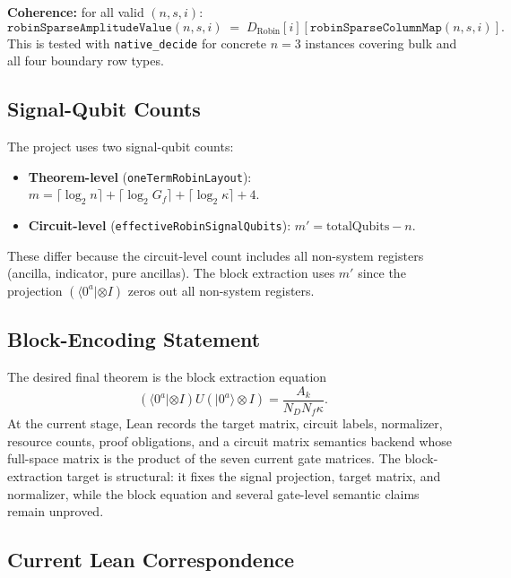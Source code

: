 \textbf{Coherence:} for all valid $(n, s, i)$:
\[
  \texttt{robinSparseAmplitudeValue}(n, s, i)
  \;=\;
  D_{\mathrm{Robin}}[i][\texttt{robinSparseColumnMap}(n, s, i)].
\]
This is tested with \texttt{native\_decide} for concrete $n = 3$ instances
covering bulk and all four boundary row types.

\subsection{Signal-Qubit Counts}

The project uses two signal-qubit counts:

\begin{itemize}
  \item \textbf{Theorem-level} (\texttt{oneTermRobinLayout}):
    $m = \lceil\log_2 n\rceil + \lceil\log_2 G_f\rceil + \lceil\log_2 \kappa\rceil + 4$.
  \item \textbf{Circuit-level} (\texttt{effectiveRobinSignalQubits}):
    $m' = \mathrm{totalQubits} - n$.
\end{itemize}

These differ because the circuit-level count includes all non-system registers
(ancilla, indicator, pure ancillas).  The block extraction uses $m'$ since the
projection $(\langle 0^a| \otimes I)$ zeros out all non-system registers.

\subsection{Block-Encoding Statement}

The desired final theorem is the block extraction equation
\[
  (\langle 0^a| \otimes I) U (|0^a\rangle \otimes I)
  =
  \frac{A_k}{N_D N_f \kappa}.
\]
At the current stage, Lean records the target matrix, circuit labels,
normalizer, resource counts, proof obligations, and a circuit matrix
semantics backend whose full-space matrix is the product of the seven current
gate matrices.  The block-extraction target is structural: it fixes the signal
projection, target matrix, and normalizer, while the block equation and several
gate-level semantic claims remain unproved.

\subsection{Current Lean Correspondence}

